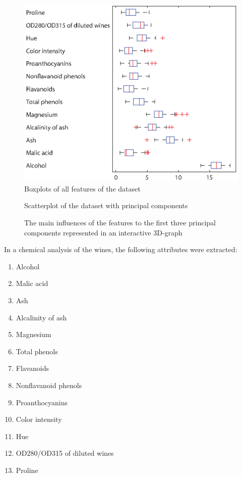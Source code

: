 \documentclass[subfigure,epsfig,fleqn,amssmb,float,caption,ausarbeitung]{scrartcl}
\begin{document}
	\begin{figure}
		\centering
			\includegraphics{img/boxplot.eps}
		\caption{Boxplots of all features of the dataset}
		\label{fig:boxes}
	\end{figure}

\begin{figure}
	\centering
	\newlength\figureheight 
	\newlength\figurewidth 
	\setlength\figureheight{7cm} 
	\setlength\figurewidth{9cm}
	
	\caption{Scatterplot of the dataset with principal components}
	\label{fig:scatter}
\end{figure}

\begin{figure}
	\centering
	\setlength\figureheight{7cm} 
	\setlength\figurewidth{7cm}
	
	\caption{The main influences of the features to the first three principal components represented in an interactive 3D-graph}
	\label{fig:inf}
\end{figure}

In a chemical analysis of the wines, the following attributes were extracted:

\begin{enumerate}
	\item Alcohol 
	\item Malic acid 
	\item Ash 
	\item Alcalinity of ash 
	\item Magnesium 
	\item Total phenols 
	\item Flavanoids 
	\item Nonflavanoid phenols 
	\item Proanthocyanins 
	\item Color intensity 
	\item Hue 
	\item OD280/OD315 of diluted wines 
	\item Proline 
\end{enumerate}
\end{document}
